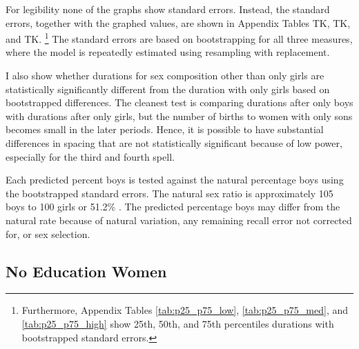 \documentclass[12pt,letterpaper]{article}
\begin{document}
For legibility none of the graphs show standard errors.
Instead, the standard errors, together with the graphed values, are shown in Appendix 
Tables TK, TK, and TK.%
\footnote{
Furthermore, Appendix Tables \ref{tab:p25_p75_low}, \ref{tab:p25_p75_med}, and 
\ref{tab:p25_p75_high} show 25th, 50th, and 75th percentiles durations with
bootstrapped standard errors.
} 
The standard errors are based on bootstrapping for all three measures,
where the model is repeatedly estimated using resampling with replacement.

I also show whether durations for sex composition other than only girls are statistically 
significantly different from the duration with only girls based on bootstrapped 
differences. 
The cleanest test is comparing durations after only boys with durations after
only girls, but the number of births to women with only sons becomes small 
in the later periods.
Hence, it is possible to have substantial differences in spacing that are
not statistically significant because of low power, especially for the third 
and fourth spell.

Each predicted percent boys is tested against the natural percentage 
boys using the bootstrapped standard errors.
The natural sex ratio is approximately 105 boys to 100 girls or
51.2\% \citep{ben-porath76b,jacobsen99,Portner2015b}.
The predicted percentage boys may differ from the natural rate because of 
natural variation, any remaining recall error not corrected for, or 
sex selection. 

\subsection{No Education Women}

\end{document}

